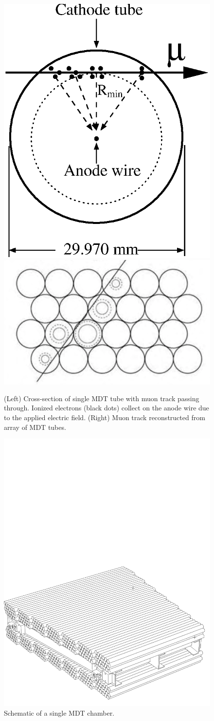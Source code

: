 \begin{figure}[ht]
\centering
\includegraphics[width=.35\textwidth]{figures/atlas/ms_mdt_tube.eps}
\includegraphics[width=.55\textwidth]{figures/atlas/ms_mdt_hits.png}
\caption{(Left) Cross-section of single MDT tube with muon track
passing through. Ionized electrons (black dots) collect on the anode wire
due to the applied electric field. (Right) Muon track
reconstructed from array of MDT tubes.}
\label{fig:atlas_ms_mdt}
\end{figure}



\begin{figure}[ht]
\centering
\includegraphics[width=.8\textwidth]{figures/atlas/ms_mdt_chamber.pdf}
\caption{Schematic of a single MDT chamber.}
\label{fig:atlas_ms_mdt_chamber}
\end{figure}

